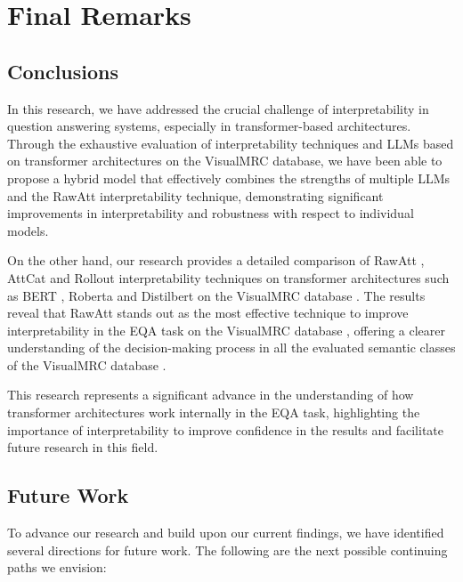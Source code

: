 \chapter{Final Remarks}
\label{ch:chapter_5}


\section{Conclusions}

In this research, we have addressed the crucial challenge of interpretability in question answering systems, especially in transformer-based architectures. Through the exhaustive evaluation of interpretability techniques and LLMs based on transformer architectures on the VisualMRC \cite{tanaka2021visualmrc} database, we have been able to propose a hybrid model that effectively combines the strengths of multiple LLMs and the RawAtt interpretability technique, demonstrating significant improvements in interpretability and robustness with respect to individual models.

On the other hand, our research provides a detailed comparison of RawAtt \cite{abnar2020quantifying}, AttCat \cite{qiang2022attcat} and Rollout \cite{abnar2020quantifying} interpretability techniques on transformer architectures such as BERT \cite{devlin2018bert}, Roberta \cite{liu2019roberta} and Distilbert \cite{sanh2019distilbert} on the VisualMRC database \cite{tanaka2021visualmrc}. The results reveal that RawAtt \cite{abnar2020quantifying} stands out as the most effective technique to improve interpretability in the EQA task on the VisualMRC database \cite{tanaka2021visualmrc}, offering a clearer understanding of the decision-making process in all the evaluated semantic classes of the VisualMRC database \cite{tanaka2021visualmrc}.

This research represents a significant advance in the understanding of how transformer architectures work internally in the EQA task, highlighting the importance of interpretability to improve confidence in the results and facilitate future research in this field.

\newpage


\section{Future Work}

To advance our research and build upon our current findings, we have identified
several directions for future work. The following are the next possible continuing paths we envision:

